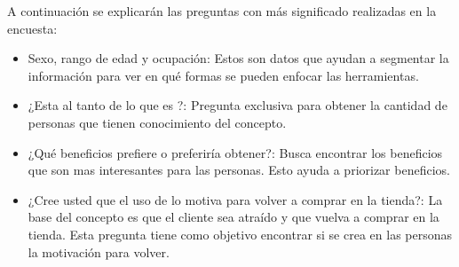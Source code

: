 A continuación se explicarán las preguntas con más significado realizadas en la encuesta:
\begin{itemize}
\item Sexo, rango de edad y ocupación: Estos son datos que ayudan a segmentar
la información para ver en qué formas se pueden enfocar las herramientas.
\item ¿Esta al tanto de lo que es {\gam}?: Pregunta exclusiva para obtener la cantidad de
personas que tienen conocimiento del concepto.
\item ¿Qué beneficios prefiere o preferiría obtener?: Busca encontrar los beneficios que son
 mas interesantes para las personas. Esto ayuda a priorizar beneficios.
\item ¿Cree usted que el uso de {\gam} lo motiva para volver a comprar en la tienda?: La
base del concepto es que el cliente sea atraído y que vuelva a comprar en la tienda. Esta pregunta
tiene como objetivo encontrar si se crea en las personas la motivación para volver.
\end{itemize}

